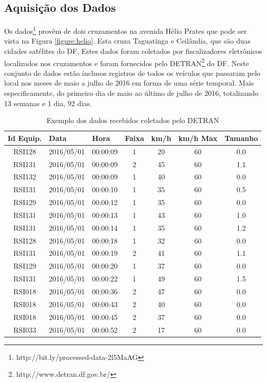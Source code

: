 \subsection{Aquisição dos Dados}

Os dados\footnote{http://bit.ly/processed-data-2l5MaAG} provêm de dois cruzamentos na avenida Hélio Prates que pode ser vista na Figura \ref{figure:helio}. Esta cruza Taguatinga e Ceilândia, que são duas cidades satélites do \acrfull{DF}. Estes dados foram coletados por fiscalizadores eletrônicos localizados nos cruzamentos e foram fornecidos pelo \acrfull{DETRAN}\footnote{http://www.detran.df.gov.br/} do \acrshort{DF}. Neste conjunto de dados estão inclusos registros de todos os veículos que passaram pelo local nos meses de maio a julho de 2016 em forma de uma série temporal. Mais especificamente, do primeiro dia de maio ao último de julho de 2016, totalizando 13 semanas e 1 dia, 92 dias. 

\begin{table}[htbp]
    \begin{tabular}{ccccccc}
    \toprule
    \multicolumn{1}{l}{\textbf{Id Equip.}} & \multicolumn{1}{l}{\textbf{Data}} & \multicolumn{1}{l}{\textbf{Hora}} & \multicolumn{1}{l}{\textbf{Faixa}} & \multicolumn{1}{l}{\textbf{km/h}} & \multicolumn{1}{l}{\textbf{km/h Max}} & \multicolumn{1}{l}{\textbf{Tamanho}} \\ 
    \midrule
        RSI128 & 2016/05/01 & 00:00:09 & 1 & 20 & 60 & 0.0 \\
    \midrule
    RSI131 & 2016/05/01 & 00:00:09 & 2 & 45 & 60 & 1.1 \\
    \midrule
    RSI132 & 2016/05/01 & 00:00:09 & 1 & 40 & 60 & 0.0 \\
    \midrule
    RSI131 & 2016/05/01 & 00:00:10 & 1 & 35 & 60 & 0.5 \\
    \midrule 
    RSI129 & 2016/05/01 & 00:00:12 & 1 & 35 & 60 & 0.0 \\
    \midrule
    RSI131 & 2016/05/01 & 00:00:13 & 1 & 43 & 60 & 1.0 \\
    \midrule
    RSI131 & 2016/05/01 & 00:00:14 & 1 & 35 & 60 & 1.2 \\
    \midrule
    RSI128 & 2016/05/01 & 00:00:18 & 1 & 32 & 60 & 0.0 \\
    \midrule
    RSI131 & 2016/05/01 & 00:00:19 & 2 & 41 & 60 & 1.1 \\
    \midrule
    RSI129 & 2016/05/01 & 00:00:20 & 1 & 37 & 60 & 0.0 \\
    \midrule
    RSI131 & 2016/05/01 & 00:00:22 & 1 & 49 & 60 & 1.5 \\
    \midrule
    RSI018 & 2016/05/01 & 00:00:36 & 2 & 47 & 60 & 0.0 \\
    \midrule
    RSI018 & 2016/05/01 & 00:00:43 & 2 & 40 & 60 & 0.0 \\
    \midrule
    RSI018 & 2016/05/01 & 00:00:45 & 2 & 37 & 60 & 0.0 \\
    \midrule
    RSI033 & 2016/05/01 & 00:00:52 & 2 & 17 & 60 & 0.0 \\
    \bottomrule
    \end{tabular}
    \label{table:data}
    \caption{Exemplo dos dados recebidos coletados pelo \acrshort{DETRAN}}
\end{table}

